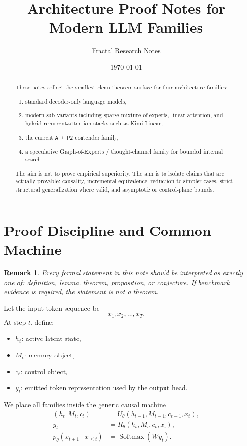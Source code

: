 \documentclass[11pt]{article}
\title{Architecture Proof Notes for Modern LLM Families}
\author{Fractal Research Notes}
\date{\today}
\newtheorem{remark}[definition]{Remark}
\newcommand{\Softmax}{\operatorname{Softmax}}
\begin{document}
\maketitle

\begin{abstract}
These notes collect the smallest clean theorem surface for four architecture
families:
\begin{enumerate}
  \item standard decoder-only language models,
  \item modern sub-variants including sparse mixture-of-experts, linear
    attention, and hybrid recurrent-attention stacks such as Kimi Linear,
  \item the current \texttt{A + P2} contender family,
  \item a speculative Graph-of-Experts / thought-channel family for bounded
    internal search.
\end{enumerate}

The aim is not to prove empirical superiority.
The aim is to isolate claims that are actually provable:
causality, incremental equivalence, reduction to simpler cases, strict
structural generalization where valid, and asymptotic or control-plane bounds.
\end{abstract}

\section{Proof Discipline and Common Machine}

\begin{remark}
Every formal statement in this note should be interpreted as exactly one of:
\emph{definition}, \emph{lemma}, \emph{theorem}, \emph{proposition}, or
\emph{conjecture}. If benchmark evidence is required, the statement is not a
theorem.
\end{remark}

Let the input token sequence be
\[
  x_1, x_2, \dots, x_T.
\]
At step $t$, define:
\begin{itemize}
  \item $h_t$: active latent state,
  \item $M_t$: memory object,
  \item $c_t$: control object,
  \item $y_t$: emitted token representation used by the output head.
\end{itemize}

We place all families inside the generic causal machine
\begin{align}
  (h_t, M_t, c_t) &= U_\theta(h_{t-1}, M_{t-1}, c_{t-1}, x_t), \\
  y_t &= R_\theta(h_t, M_t, c_t, x_t), \\
  p_\theta(x_{t+1}\mid x_{\le t}) &= \Softmax(W y_t).
\end{align}
\end{document}
